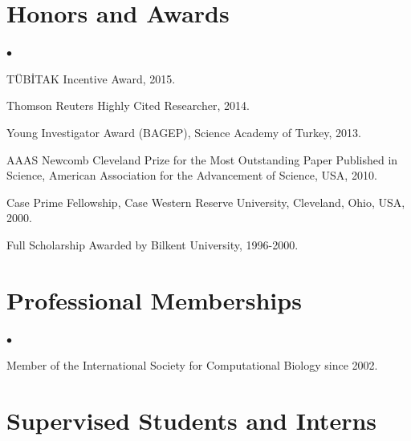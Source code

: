\documentclass[margin,line]{res}
\newenvironment{list2}{
  \begin{list}{$\bullet$}{%
      \setlength{\itemsep}{0in}
      \setlength{\parsep}{0in} \setlength{\parskip}{0in}
      \setlength{\topsep}{0in} \setlength{\partopsep}{0in} 
      \setlength{\leftmargin}{0.2in}}}{\end{list}}
\newcommand{\junk}[1]{}
\begin{document}
\begin{resume}
          \section{\sc Honors and Awards} 
          \begin{list2}
            \junk{
            \item
              Ranked 36$^{th}$ among 1.2 million examinees in the Nationwide University
              Entrance Examinations in ~Turkey, 1996.
            \item
              Ranked 40$^{th}$ in the Nationwide Post-Graduate Education Examination in Turkey, 1999.
            }
          \item
            TÜBİTAK Incentive Award, 2015.
          \item
            Thomson Reuters Highly Cited Researcher, 2014.
          \item
            Young Investigator Award (BAGEP), Science Academy of Turkey, 2013.
          \item
            AAAS Newcomb Cleveland Prize for the Most Outstanding Paper Published in Science, American Association for the Advancement of Science, USA, 2010.
          \item
            Case Prime Fellowship, Case Western Reserve University, Cleveland, Ohio, USA, 2000.
          \item
            Full Scholarship Awarded by Bilkent University, 1996-2000.
          \end{list2}
          

\vspace*{-.2cm}
\section{\sc Professional Memberships}
\begin{list2}
\item 
  Member of the International Society for Computational Biology since 2002.
\end{list2}

\clearpage

\section{\sc Supervised Students and Interns}
\vspace*{-.4cm}

\end{resume}
\end{document}
